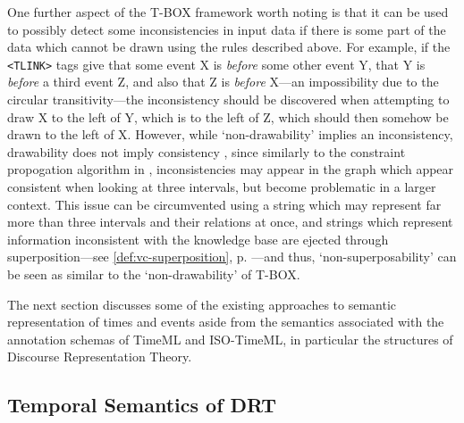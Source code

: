 \documentclass[a4paper,12pt,leqno]{article}
\newcommand{\nb}[1]{{\color{red}[NB\footnote{{\color{red}#1}}]}}
\begin{document}
One further aspect of the T-BOX framework worth noting is that it can be used to possibly detect some inconsistencies in input data if there is some part of the data which cannot be drawn using the rules described above. For example, if the \verb|<TLINK>| tags give that some event X is \textit{before} some other event Y, that Y is \textit{before} a third event Z, and also that Z is \textit{before} X---an impossibility due to the circular transitivity---the inconsistency should be discovered when attempting to draw X to the left of Y, which is to the left of Z, which should then somehow be drawn to the left of X. However, while `non-drawability' implies an inconsistency, drawability does not imply consistency \citep[p. 12]{verhagen2005TBOX}, since similarly to the constraint propogation algorithm in \citet{allen1983maintaining}, inconsistencies may appear in the graph which appear consistent when looking at three intervals, but become problematic in a larger context. This issue can be circumvented using a string which may represent far more than three intervals and their relations at once, and strings which represent information inconsistent with the knowledge base are ejected through superposition---see \cref{def:vc-superposition}, p. \pageref{def:vc-superposition}---and thus, `non-superposability' can be seen as similar to the `non-drawability' of T-BOX.

The next section discusses some of the existing approaches to semantic representation of times and events aside from the semantics associated with the annotation schemas of TimeML and ISO-TimeML, in particular the structures of Discourse Representation Theory.

\subsection{Temporal Semantics of DRT}\label{sub:semantics}
\end{document}
